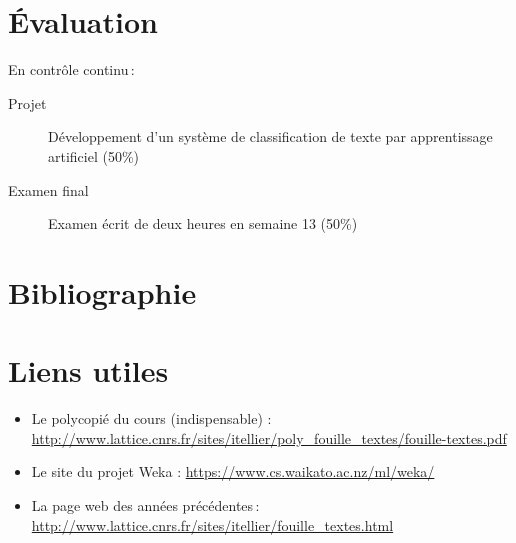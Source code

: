 \documentclass[a4paper, 11pt]{article}
\begin{document}
\section*{Évaluation}
En contrôle continu :

\begin{description}
    \item[Projet] Développement d'un système de classification de texte par apprentissage artificiel (50\%)
    \item[Examen final] Examen écrit de deux heures en semaine 13 (50\%)
\end{description}

\section*{Bibliographie}
\printbibliography[heading=none]

\section*{Liens utiles}
\begin{itemize}
    \item Le polycopié du cours (indispensable) :  \url{http://www.lattice.cnrs.fr/sites/itellier/poly_fouille_textes/fouille-textes.pdf}
    \item Le site du projet Weka : \url{https://www.cs.waikato.ac.nz/ml/weka/}
    \item La page web des années précédentes : \url{http://www.lattice.cnrs.fr/sites/itellier/fouille_textes.html}
\end{itemize}
\end{document}
